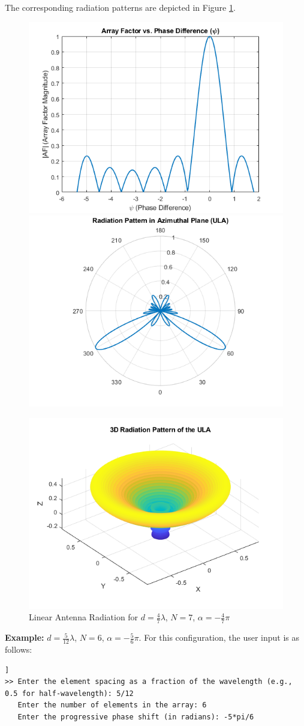 \documentclass[a4paper, 12pt, english]{article}
\begin{document}
The corresponding radiation patterns are depicted in Figure \ref{fig:ula 1}.
\begin{figure}[H]
    \centering
         \includegraphics[width=0.49\linewidth]{report/images/ula_2D_1.png}
         \hfill
         \includegraphics[width=0.49\linewidth]{report/images/ula_2D_rad_1.png}
         \hfill

         \includegraphics[width=0.49\linewidth]{report/images/ula_3D_1.png}
         \caption{Linear Antenna Radiation for $ {d} = {\frac{4}{7}}{\lambda} $, $ {N} = {7} $, $ {\alpha} = -{\frac{4}{7}}{\pi} $}
         \label{fig:ula 1}
\end{figure}

\noindent
\textbf{Example:} $ {d} = {\frac{5}{12}}{\lambda} $, $ {N} = {6} $, $ {\alpha} = -{\frac{5}{6}}{\pi} $.
\newline
For this configuration, the user input is as follows:
\begin{lstlisting}[style=commandstyle,caption=Command line output]]
>> Enter the element spacing as a fraction of the wavelength (e.g., 0.5 for half-wavelength): 5/12
   Enter the number of elements in the array: 6
   Enter the progressive phase shift (in radians): -5*pi/6
\end{lstlisting}
\end{document}
